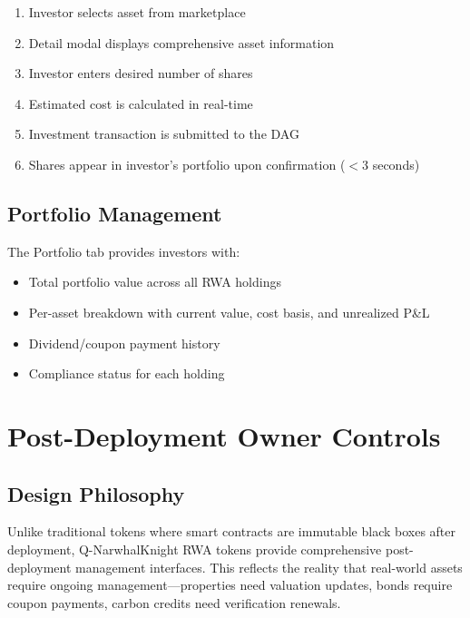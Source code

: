 \documentclass[11pt,a4paper,twoside]{article}
\begin{document}
\begin{enumerate}
  \item Investor selects asset from marketplace
  \item Detail modal displays comprehensive asset information
  \item Investor enters desired number of shares
  \item Estimated cost is calculated in real-time
  \item Investment transaction is submitted to the DAG
  \item Shares appear in investor's portfolio upon confirmation ($<$3 seconds)
\end{enumerate}

\subsection{Portfolio Management}

The Portfolio tab provides investors with:
\begin{itemize}
  \item Total portfolio value across all RWA holdings
  \item Per-asset breakdown with current value, cost basis, and unrealized P\&L
  \item Dividend/coupon payment history
  \item Compliance status for each holding
\end{itemize}

\section{Post-Deployment Owner Controls}
\label{sec:owner-controls}

\subsection{Design Philosophy}

Unlike traditional tokens where smart contracts are immutable black boxes after deployment, Q-NarwhalKnight RWA tokens provide comprehensive post-deployment management interfaces. This reflects the reality that real-world assets require ongoing management---properties need valuation updates, bonds require coupon payments, carbon credits need verification renewals.
\end{document}
